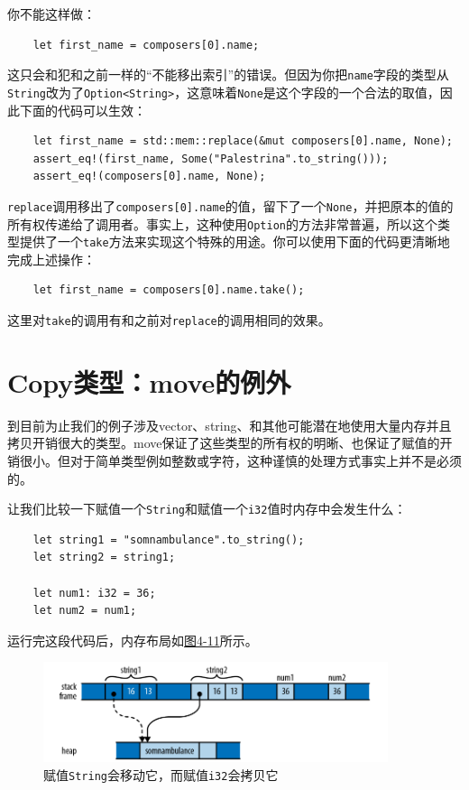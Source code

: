 你不能这样做：
\begin{verbatim}
    let first_name = composers[0].name;
\end{verbatim}

这只会和犯和之前一样的“不能移出索引”的错误。但因为你把\texttt{name}字段的类型从\texttt{String}改为了\texttt{Option<String>}，这意味着\texttt{None}是这个字段的一个合法的取值，因此下面的代码可以生效：
\begin{verbatim}
    let first_name = std::mem::replace(&mut composers[0].name, None);
    assert_eq!(first_name, Some("Palestrina".to_string()));
    assert_eq!(composers[0].name, None);
\end{verbatim}

\texttt{replace}调用移出了\texttt{composers[0].name}的值，留下了一个\texttt{None}，并把原本的值的所有权传递给了调用者。事实上，这种使用\texttt{Option}的方法非常普遍，所以这个类型提供了一个\texttt{take}方法来实现这个特殊的用途。你可以使用下面的代码更清晰地完成上述操作：
\begin{verbatim}
    let first_name = composers[0].name.take();
\end{verbatim}
这里对\texttt{take}的调用有和之前对\texttt{replace}的调用相同的效果。

\section{Copy类型：move的例外}
到目前为止我们的例子涉及vector、string、和其他可能潜在地使用大量内存并且拷贝开销很大的类型。move保证了这些类型的所有权的明晰、也保证了赋值的开销很小。但对于简单类型例如整数或字符，这种谨慎的处理方式事实上并不是必须的。

让我们比较一下赋值一个\texttt{String}和赋值一个\texttt{i32}值时内存中会发生什么：
\begin{verbatim}
    let string1 = "somnambulance".to_string();
    let string2 = string1;

    let num1: i32 = 36;
    let num2 = num1;
\end{verbatim}

运行完这段代码后，内存布局如\hyperref[f4-11]{图4-11}所示。
\begin{figure}[htbp]
    \centering
    \includegraphics[width=0.9\textwidth]{../img/f4-11.png}
    \caption{赋值\texttt{String}会移动它，而赋值\texttt{i32}会拷贝它}
    \label{f4-11}
\end{figure}


